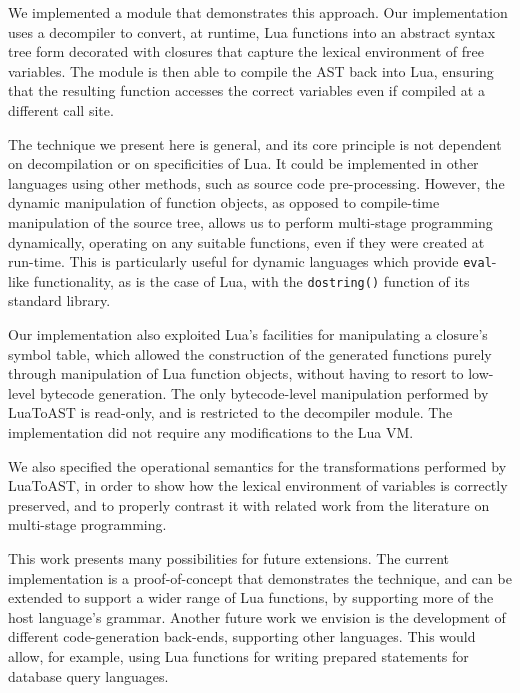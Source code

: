 \documentclass[english]{llncs}
\begin{document}
We implemented a module that demonstrates this approach.
Our implementation uses a decompiler to convert, at runtime, Lua
functions into an abstract syntax tree form decorated with
closures that capture the lexical environment of free variables.
The module is then able to compile the AST back into Lua,
ensuring that the resulting function accesses the correct variables
even if compiled at a different call site.

The technique we present here is general, and its core principle
is not dependent on decompilation or on specificities of Lua.
It could be implemented in other languages using other methods,
such as source code pre-processing. However, the dynamic manipulation
of function objects, as opposed to compile-time manipulation of the
source tree, allows us to perform multi-stage programming dynamically,
operating on any suitable functions, even if they were created at run-time.
This is particularly useful for dynamic languages which provide
\texttt{eval}-like functionality, as is the case of Lua, with
the \texttt{dostring()} function of its standard library.

Our implementation also exploited Lua's facilities for manipulating
a closure's symbol table, which allowed the construction of the
generated functions purely through manipulation of Lua function
objects, without having to resort to low-level bytecode generation.
The only bytecode-level manipulation performed by LuaToAST is
read-only, and is restricted to the decompiler module. The
implementation did not require any modifications to the Lua VM.

We also specified the operational semantics for the transformations
performed by LuaToAST, in order to show how the lexical environment
of variables is correctly preserved, and to properly contrast it with
related work from the literature on multi-stage programming.

This work presents many possibilities for future extensions. The current
implementation is a proof-of-concept that demonstrates the technique,
and can be extended to support a wider range of Lua functions, by
supporting more of the host language's grammar. Another future work
we envision is the development of different code-generation back-ends,
supporting other languages. This would allow, for example, using
Lua functions for writing prepared statements for database query
languages.




\end{document}
